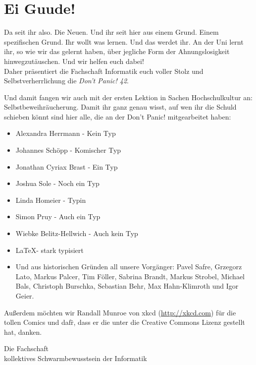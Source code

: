 \section*{Ei Guude!}
Da seit ihr also. Die Neuen. Und ihr seit hier aus einem Grund. Einem spezifischen Grund. Ihr wollt was lernen.
Und das werdet ihr. An der Uni lernt ihr, so wie wir das gelernt haben,
\"uber jegliche Form der Ahnungslosigkeit hinwegzut\"auschen. Und wir helfen euch dabei!\\
Daher pr\"asentiert die Fachschaft Informatik euch voller Stolz und Selbstverherrlichung die \emph{Don't Panic! 42}.

Und damit fangen wir auch mit der ersten Lektion in Sachen Hochschulkultur an: Selbstbeweihr\"aucherung.
Damit ihr ganz genau wisst, auf wen ihr die Schuld schieben k\"onnt sind hier alle, die an der Don't Panic! mitgearbeitet haben:
\begin{itemize}
	\item Alexandra Herrmann - Kein Typ
	\item Johannes Schöpp - Komischer Typ
	\item Jonathan Cyriax Brast - Ein Typ
	\item Joshua Sole - Noch ein Typ
	\item Linda Homeier - Typin
	\item Simon Pruy - Auch ein Typ
	\item Wiebke Belitz-Hellwich - Auch kein Typ
	\item \LaTeX - stark typisiert
	\item Und aus historischen Gr\"unden all unsere Vorg\"anger:
	Pavel Safre, Grzegorz Lato, Markus Palcer, Tim F\"oller, Sabrina Brandt, Markus Strobel, Michael Bals, Christoph Burschka, Sebastian Behr, Max Hahn-Klimroth und Igor Geier.
\end{itemize}
Außerdem möchten wir Randall Munroe von xkcd (\url{http://xkcd.com}) für die tollen Comics und daf\"r, dass er die unter die Creative Commons Lizenz gestellt hat, danken.\\

\begin{flushright}Die Fachschaft\\\tiny kollektives Schwarmbewusstsein der Informatik\end{flushright}
